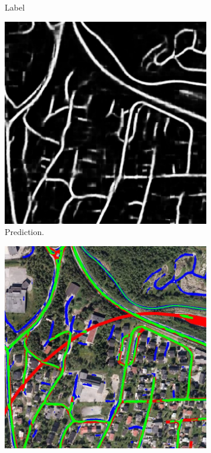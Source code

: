 \begin{figure}[H]
\begin{subfigure}{0.23\textwidth}
\caption{Label}
\vspace{0.1cm} %
\end{subfigure}
\hspace*{\fill} %
\begin{subfigure}{0.23\textwidth}
\includegraphics[width=\textwidth]{figs/appendix/pred1217.jpg}
\caption{Prediction.}
\vspace{0.1cm} %
\end{subfigure}
\hspace*{\fill} %
\begin{subfigure}{0.23\textwidth}
\includegraphics[width=\textwidth]{figs/appendix/hit1217.jpg}

\end{subfigure}
\end{figure}
